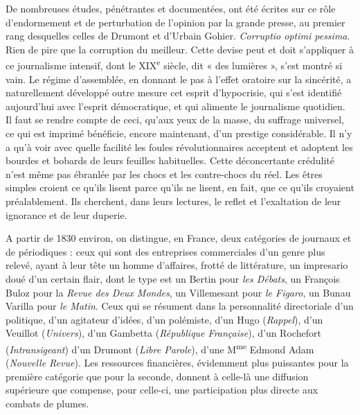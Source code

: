\documentclass[french,twoside]{book} %
\begin{document}
De nombreuses études, pénétrantes et documentées, ont été écrites sur ce rôle d’endormement et de perturbation de l’opinion par la grande presse, au premier rang desquelles celles de Drumont et d’Urbain Gohier. {\itshape Corruptio optimi pessima}. Rien de pire que la corruption du meilleur. Cette devise peut et doit s’appliquer à ce journalisme intensif, dont le XIX\textsuperscript{e} siècle, dit « des lumières », s’est montré si vain. Le régime d’assemblée, en donnant le pas à l’effet oratoire sur la sincérité, a naturellement développé outre mesure cet esprit d’hypocrisie, qui s’est identifié aujourd’hui avec l’esprit démocratique, et qui alimente le journalisme quotidien. Il faut se rendre compte de ceci, qu’aux yeux de la masse, du suffrage universel, ce qui est imprimé bénéficie, encore maintenant, d’un prestige considérable. Il n’y a qu’à voir avec quelle facilité les foules révolutionnaires acceptent et adoptent les bourdes et bobards de leurs feuilles habituelles. Cette déconcertante crédulité n’est même pas ébranlée par les chocs et les contre-chocs du réel. Les êtres simples croient ce qu’ils lisent parce qu’ils ne lisent, en fait, que ce qu’ils croyaient préalablement. Ils cherchent, dans leurs lectures, le reflet et l’exaltation de leur ignorance et de leur duperie.\par
A partir de 1830 environ, on distingue, en France, deux catégories de journaux et de périodiques : ceux qui sont des entreprises commerciales d’un genre plus relevé, ayant à leur tête un homme d’affaires, frotté de littérature, un impresario doué d’un certain flair, dont le type est un Bertin pour {\itshape les Débats}, un François Buloz pour la {\itshape Revue des Deux Mondes}, un Villemesant pour {\itshape le Figaro}, un Bunau Varilla pour {\itshape le Matin}. Ceux qui se résument dans la personnalité directoriale d’un politique, d’un agitateur d’idées, d’un polémiste, d’un Hugo ({\itshape Rappel}), d’un Veuillot ({\itshape Univers}), d’un Gambetta ({\itshape République Française}), d’un Rochefort ({\itshape Intransigeant}) d’un Drumont ({\itshape Libre Parole}), d’une M\textsuperscript{me} Edmond Adam ({\itshape Nouvelle Revue}). Les ressources financières, évidemment plus puissantes pour la première catégorie que pour la seconde, donnent à celle-là une diffusion supérieure que compense, pour celle-ci, une participation plus directe aux combats de plumes.\par
\end{document}
